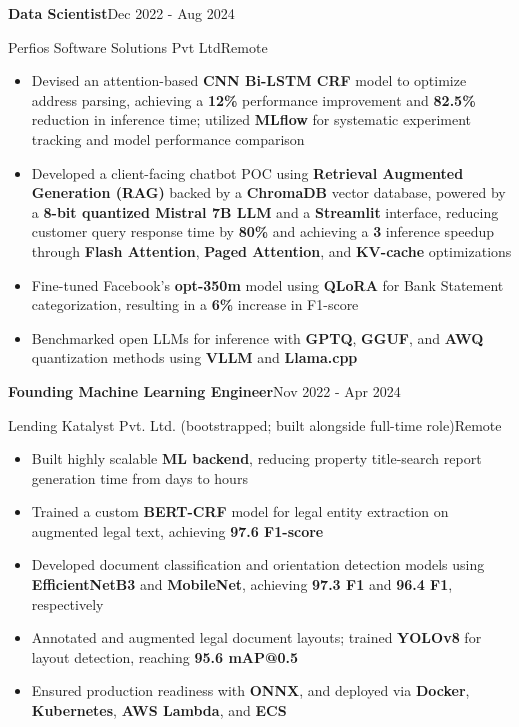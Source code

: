 \documentclass[9pt]{article}
\newcommand{\resumeRole}[4]{%
  \textbf{#1}\hfill #2\par
  #3\hfill #4\par
}
\newcommand{\kw}[1]{\textbf{#1}}
\begin{document}
\vspace{0pt}
\resumeRole{Data Scientist}{Dec 2022 - Aug 2024}{Perfios Software Solutions Pvt Ltd}{Remote}
\begin{itemize}
  \item Devised an attention-based \kw{CNN Bi-LSTM CRF} model to optimize address parsing, achieving a \kw{12\%} performance improvement and \kw{82.5\%} reduction in inference time; utilized \kw{MLflow} for systematic experiment tracking and model performance comparison
  \item Developed a client-facing chatbot POC using \kw{Retrieval Augmented Generation (RAG)} backed by a \kw{ChromaDB} vector database, powered by a \kw{8-bit quantized Mistral 7B LLM} and a \kw{Streamlit} interface, reducing customer query response time by \kw{80\%} and achieving a \kw{3\texttimes{}} inference speedup through \kw{Flash Attention}, \kw{Paged Attention}, and \kw{KV-cache} optimizations
  \item Fine-tuned Facebook's \kw{opt-350m} model using \kw{QLoRA} for Bank Statement categorization, resulting in a \kw{6\%} increase in F1-score
  \item Benchmarked open LLMs for inference with \kw{GPTQ}, \kw{GGUF}, and \kw{AWQ} quantization methods using \kw{VLLM} and \kw{Llama.cpp}
\end{itemize}

\vspace{0pt}
\resumeRole{Founding Machine Learning Engineer}{Nov 2022 - Apr 2024}{Lending Katalyst Pvt. Ltd. (bootstrapped; built alongside full-time role)}{Remote}
\begin{itemize}
  \item Built highly scalable \kw{ML backend}, reducing property title-search report generation time from days to hours
  \item Trained a custom \kw{BERT-CRF} model for legal entity extraction on augmented legal text, achieving \kw{97.6 F1-score}
  \item Developed document classification and orientation detection models using \kw{EfficientNetB3} and \kw{MobileNet}, achieving \kw{97.3 F1} and \kw{96.4 F1}, respectively
  \item Annotated and augmented legal document layouts; trained \kw{YOLOv8} for layout detection, reaching \kw{95.6 mAP@0.5}
  \item Ensured production readiness with \kw{ONNX}, and deployed via \kw{Docker}, \kw{Kubernetes}, \kw{AWS Lambda}, and \kw{ECS}
\end{itemize}
\end{document}

